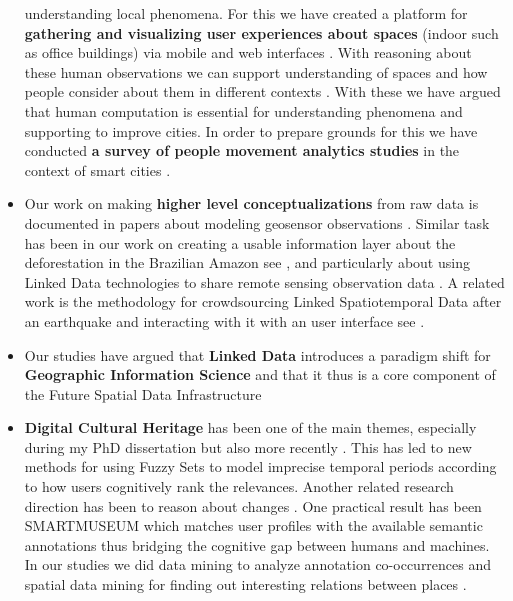 \documentclass[11pt,letterpaper]{article}
\begin{document}
\begin{itemize}
understanding local phenomena. For this we have created a platform for
\textbf{gathering and visualizing user experiences about spaces} (indoor such as
office buildings) via mobile and web interfaces \cite{yousense-2014}. With
reasoning about these human observations we can support understanding of spaces
and how people consider about them in different contexts \cite{reasoning-indoor-2018}. With these we have argued that human computation is essential for understanding phenomena and supporting to improve cities. In order to prepare grounds for this we have conducted  \textbf{a survey of people movement analytics studies} in the context of smart cities \cite{survey-movement-analytics}.
\item Our work on making \textbf{higher level conceptualizations} from raw data is documented in papers about modeling geosensor observations
  		\cite{devaraju-kauppinen-sensors-2010}
  		\cite{modeling-sensor-observations-2012}. Similar task has been in our work on creating a usable information layer about the deforestation in the Brazilian Amazon see
  		\cite{kauppinen2011a} \cite{kauppinen2010e}, and particularly about using
  		Linked Data technologies to share remote sensing observation data
  		\cite{kauppinen-remote-sensing-data-2012}. A related work is the methodology for crowdsourcing Linked Spatiotemporal Data after an earthquake and interacting with it with an user interface see
  		\cite{crowdsourcing-lod-2011} \cite{kauppinen-visualizing-2013}.
\item Our studies have argued that \textbf{Linked Data} introduces a paradigm shift for \textbf{Geographic Information Science} \cite{linkeddata-paradigmshift-2014} and that it thus is a core component of the Future Spatial Data Infrastructure \cite{futureSDI-2012}
\item \textbf{Digital Cultural Heritage} has been one of the main themes, especially during my PhD dissertation
 		\cite{kauppinen-dissertation-2010} but also more recently \cite{semantic-gazetteer-2021}. This has led to new methods for using Fuzzy Sets to model imprecise temporal periods
  		\cite{kauppinen-et-al-temporal-relevance-2010} according to how users cognitively rank the relevances. Another related research direction has been to reason about changes \cite{kauppinen-et-al-geospatio-temporal-2010}. One practical result has been SMARTMUSEUM
		\cite{kauppinen-et-al-smartmuseum-2009,smartmuseum-eva-2009,Ruotsalo-smartmuseum:2009,smartmuseum2013} which matches user profiles with the available semantic annotations thus bridging the cognitive gap between humans and machines. In our studies we did data mining to analyze annotation co-occurrences
		\cite{kauppinen-et-al-extending-ci-2008}
and spatial data mining for finding out interesting relations between places
		\cite{kauppinen-et-al-learning-eswc-2009}.


\end{itemize}
\end{document}
